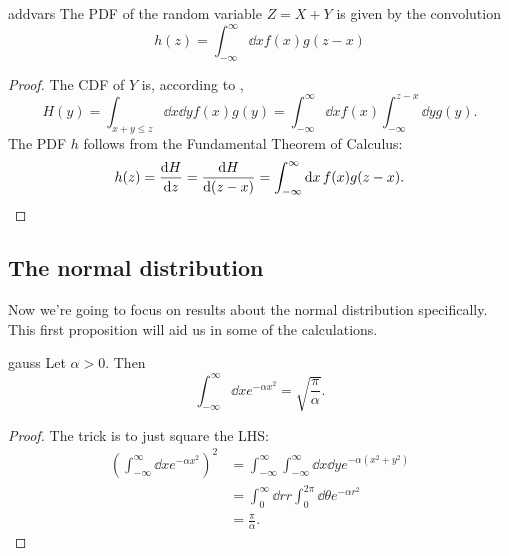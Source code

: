 \begin{proposition}{}{addvars}
  The PDF of the random variable $Z=X+Y$ is given by the convolution
  \begin{equation*}
    h(z)=\int_{-\infty}^\infty\dd{x}f(x)g(z-x)
  \end{equation*}
  \begin{proof}
    The CDF of $Y$ is, according to ,
    \begin{equation*}
      H(y)=\int_{x+y\leq z}\dd{x}\dd{y}f(x)g(y)
          =\int_{-\infty}^\infty\dd{x}f(x)\int_{-\infty}^{z-x}
            \dd{y}g(y).
    \end{equation*}
    The PDF $h$ follows from the Fundamental Theorem of Calculus:
    \begin{equation*}
      h(z)=\dv{H}{z}=\dv{H}{(z-x)}
          =\int_{-\infty}^\infty\dd{x}f(x)g(z-x).
    \end{equation*}
  \end{proof}
\end{proposition}


\subsection{The normal distribution}
Now we're going to focus on results about the normal distribution specifically.
This first proposition will aid us in some of the calculations.

\begin{proposition}{}{gauss}
  Let $\alpha>0$. Then
  \begin{equation*}
    \int_{-\infty}^\infty\dd{x}e^{-\alpha x^2}=\sqrt{\frac{\pi}{\alpha}}.
  \end{equation*}
  \begin{proof}
    The trick is to just square the LHS:
    \begin{equation*}\begin{aligned}
      \left(\int_{-\infty}^\infty\dd{x}e^{-\alpha x^2}\right)^2
      &=\int_{-\infty}^\infty\int_{-\infty}^\infty\dd{x}\dd{y}
        e^{-\alpha(x^2+y^2)}\\
      &=\int_0^\infty \dd{r}r\int_0^{2\pi}\dd{\theta}e^{-\alpha r^2}\\
      &=\frac{\pi}{\alpha}.
    \end{aligned}\end{equation*}
  \end{proof}
\end{proposition}

